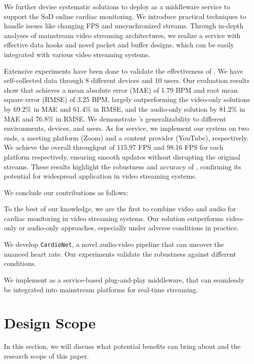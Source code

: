 We further devise systematic solutions to deploy \sysname as a middleware service to support the SoD online cardiac monitoring. 
We introduce practical techniques to handle issues like changing FPS and unsynchronized streams. 
Through in-depth analyses of mainstream video streaming architectures, we realize a \sysname service with effective data hooks and novel packet and buffer designs, which can be easily integrated with various video streaming systems. 

Extensive experiments have been done to validate the effectiveness of \sysname. We have self-collected data through 8 different devices and 10 users. Our evaluation results show that \sysname achieves a mean absolute error (MAE) of 1.79 BPM and root mean square error (RMSE) of 3.25 BPM, largely outperforming the video-only solutions by 69.2\% in MAE and 61.4\% in RMSE,  and the audio-only solution by 81.2\% in MAE and 76.8\% in RMSE. We demonstrate \sysname's generalizability to different environments, devices, and users.
As for \sysname service, we implement our system on two ends, a meeting platform (Zoom) and a content provider (YouTube), respectively. We achieve the overall throughput of 115.97 FPS and 98.16 FPS for each platform respectively, ensuring smooth updates without disrupting the original streams.
These results highlight the robustness and accuracy of \sysname, confirming its potential for widespread application in video streaming systems.

 We conclude our contributions as follows:

\noindent{} To the best of our knowledge, we are the first to combine video and audio for cardiac monitoring in video streaming systems. Our solution outperforms video-only or audio-only approaches, especially under adverse conditions in practice.


\noindent{} We develop \texttt{CardioNet}, a novel audio-video pipeline that can uncover the nuanced heart rate. Our experiments validate the robustness against different conditions.

\noindent{} We implement \sysname as a service-based plug-and-play middleware, that can seamlessly be integrated into mainstream platforms for real-time streaming.


\section{Design Scope}
In this section, we will discuss what potential benefits \sysname can bring about and the research scope of this paper. 


